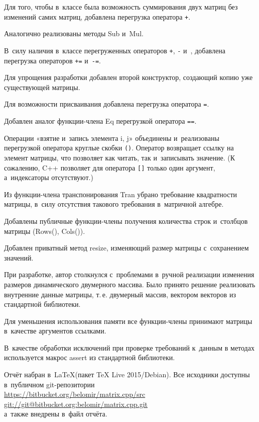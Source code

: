 \documentclass[a4paper,14pt]{extreport}
\begin{document}
Для того, чтобы в классе была возможность суммирования двух матриц без изменений самих матриц, добавлена перегрузка оператора {\tt +}.

Аналогично реализованы методы Sub и Mul.

В силу наличия в классе перегруженных операторов {\tt +}, {\tt -} и {\tt *}, добавлена перегрузка операторов {\tt +=} и {\tt -=}.

Для упрощения разработки добавлен второй конструктор, создающий копию уже существующей матрицы.

Для возможности присваивания добавлена перегрузка оператора {\tt =}.

Добавлен аналог функции-члена Eq перегрузкой оператора {\tt ==}.

Операции «взятие и запись элемента i, j» объединены и реализованы перегрузкой оператора круглые скобки {\tt ()}.
Оператор возвращает ссылку на элемент матрицы, что позволяет как читать, так и записывать значение.
(К сожалению, C++ позволяет для оператора {\tt []} только один аргумент, а индексаторы отсутствуют.)

Из функции-члена транспонирования Tran убрано требование квадратности матрицы, в силу отсутствия такового требования в матричной алгебре.

Добавлены публичные функции-члены получения количества строк и столбцов матрицы (Rows(), Cols()).

Добавлен приватный метод resize, изменяющий размер матрицы с сохранением значений.

При разработке, автор столкнулся с проблемами в ручной реализации изменения размеров динамического двумерного массива.
Было принято решение реализовать внутренние данные матрицы, \mbox{т.\,е.} двумерный массив, вектором векторов из стандартной библиотеки.

Для уменьшения использования памяти все функции-члены принимают матрицы в качестве аргументов ссылками.

В качестве обработки исключений при проверке требований к данным в методах используется макрос assert из стандартной библиотеки.

Отчёт набран в \LaTeX (пакет TeX Live 2015/Debian).
Все исходники доступны в публичном git-репозитории\\
\url{https://bitbucket.org/belomir/matrix.cpp/src}\\
\url{git://git@bitbucket.org:belomir/matrix.cpp.git}\\
а также внедрены в файл отчёта.

\appendix
\end{document}
